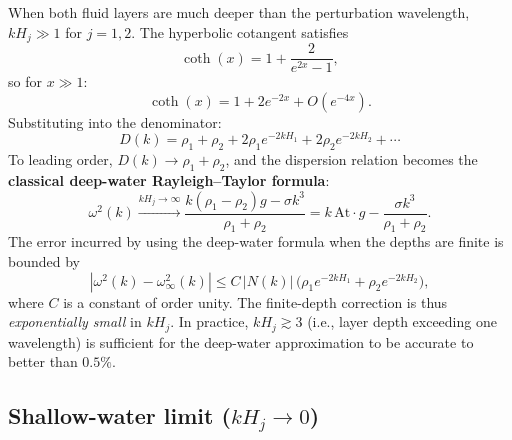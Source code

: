 \documentclass[11pt,a4paper]{article}
\begin{document}
When both fluid layers are much deeper than the perturbation wavelength, $kH_j\gg 1$ for $j=1,2$.  The hyperbolic cotangent satisfies
\begin{equation}
    \coth(x) = 1 + \frac{2}{e^{2x}-1},
\end{equation}
so for $x\gg 1$:
\begin{equation}
    \coth(x) = 1 + 2e^{-2x} + O(e^{-4x}).
    \label{eq:coth_deep_expansion}
\end{equation}
Substituting into the denominator:
\begin{equation}
    D(k) = \rho_1 + \rho_2 + 2\rho_1 e^{-2kH_1} + 2\rho_2 e^{-2kH_2} + \cdots
\end{equation}
To leading order, $D(k)\to\rho_1+\rho_2$, and the dispersion relation becomes the \textbf{classical deep-water Rayleigh--Taylor formula}:
\begin{equation}
    \boxed{
    \omega^2(k) \xrightarrow{kH_j\to\infty}
    \frac{k(\rho_1-\rho_2)g - \sigma k^3}{\rho_1+\rho_2}
    =
    k\,\mathrm{At}\cdot g - \frac{\sigma k^3}{\rho_1+\rho_2}.
    }
    \label{eq:deep_water_dispersion}
\end{equation}
The error incurred by using the deep-water formula when the depths are finite is bounded by
\begin{equation}
    \left|\omega^2(k) - \omega^2_{\infty}(k)\right|
    \le
    C\,|N(k)|\,\bigl(\rho_1 e^{-2kH_1} + \rho_2 e^{-2kH_2}\bigr),
    \label{eq:deep_water_error}
\end{equation}
where $C$ is a constant of order unity.  The finite-depth correction is thus \emph{exponentially small} in $kH_j$.  In practice, $kH_j\gtrsim 3$ (i.e., layer depth exceeding one wavelength) is sufficient for the deep-water approximation to be accurate to better than $0.5\%$.

\subsection{Shallow-water limit ($kH_j\to 0$)}
\end{document}
